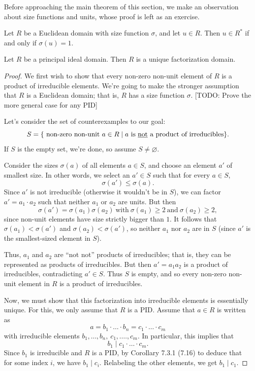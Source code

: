 \documentclass[math1530-lecture-notes]{subfiles}
\begin{document}
Before approaching the main theorem of this section, we make an observation about size functions and
units, whose proof is left as an exercise.
\begin{theorem}{}
  Let $R$ be a Euclidean domain with size function $\sigma$, and let $u\in R$. Then $u\in R^*$ if
  and only if $\sigma(u)=1$.
\end{theorem}

\begin{theorem}{}
  Let $R$ be a principal ideal domain. Then $R$ is a unique factorization domain.
\end{theorem}
\begin{proof}[Proof]
  We first wish to show that every non-zero non-unit element of $R$ is a product of irreducible
  elements. We're going to make the stronger assumption that $R$ is a Euclidean domain; that is, $R$
  has a size function $\sigma$. [TODO: Prove the more general case for any PID]

  Let's consider the set of counterexamples to our goal: \[
    S=\{~\text{non-zero non-unit}~a\in R\mid a~\text{is \underline{not} a product of irreducibles}\} 
  .\] If $S$ is the empty set, we're done, so assume $S\neq \varnothing$.

  Consider the sizes $\sigma(a)$ of all elements $a\in S$, and choose an element $a'$ of smallest
  size. In other words, we select an $a'\in S$ such that for every $a\in S$, \[
    \sigma(a')\le \sigma(a)
  .\] Since $a'$ is not irreducible (otherwise it wouldn't be in $S$), we can factor $a'=a_1\cdot
  a_2$ such that neither $a_1$ or $a_2$ are units. But then \[
    \sigma(a')=\sigma(a_1)\sigma(a_2)~\text{with}~\sigma(a_1)\ge 2~\text{and}~\sigma(a_2)\ge 2
  ,\] since non-unit elements have size strictly bigger than $1$. It follows that
  $\sigma(a_1)<\sigma(a')$ and $\sigma(a_2)<\sigma(a')$, so neither $a_1$ nor $a_2$ are in $S$
  (since $a'$ is the smallest-sized element in $S$).

  Thus, $a_1$ and $a_2$ are ``not not'' products of irreducibles; that is, they can be represented
  as products of irreducibles. But then $a'=a_1a_2$ is a product of irreducibles, contradicting
  $a'\in S$. Thus $S$ is empty, and so every non-zero non-unit element in $R$ is a product of
  irreducibles. 

  Now, we must show that this factorization into irreducible elements is essentially unique. For
  this, we only assume that $R$ is a PID. Assume that $a\in R$ is written as \[
    a=b_1\cdot \ldots\cdot b_n=c_1\cdot \ldots\cdot c_m
  \] with irreducible elements $b_1,\ldots,b_n,\ c_1,.\ldots,c_m$. In particular, this implies that
  \[
    b_1\mid c_1\cdot \ldots\cdot c_m
  .\] Since $b_1$ is irreducible and $R$ is a PID, by Corollary 7.3.1 (7.16) to deduce that for some
  index $i$, we have $b_1\mid c_i$. Relabeling the other elements, we get $b_1\mid c_1$.


\end{proof}
\end{document}
